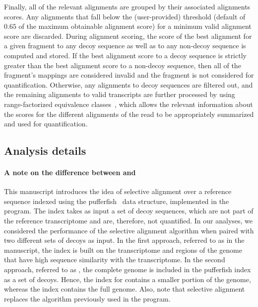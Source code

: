 Finally, all of the relevant alignments are grouped by their associated
alignments scores. Any alignments that fall below the (user-provided) threshold
(default of $0.65$ of the maximum obtainable alignment score) for a minimum
valid alignment score are discarded. During alignment scoring, the score of the
best alignment for a given fragment to any decoy sequence as well as to any
non-decoy sequence is computed and stored. If the best alignment score to a
decoy sequence is strictly greater than the best alignment score to a non-decoy
sequence, then all of the fragment's mappings are considered invalid and the
fragment is not considered for quantification. Otherwise, any alignments to
decoy sequences are filtered out, and the remaining alignments to valid
transcripts are further processed by \salmon using range-factorized equivalence
classes~\cite{ddfact}, which allows the relevant information about the scores
for the different alignments of the read to be appropriately summarized and used
for quantification.

\subsection{Analysis details}
\label{subsec:notes}

\paragraph{A note on the difference between \hsa and \saf}
This manuscript introduces the idea of selective alignment over a reference sequence 
indexed using the pufferfish~\cite{pufferfish} data structure, implemented in the \salmon program. The index
takes as input a set of decoy sequences, which are not part of the reference transcriptome 
and are, therefore, not quantified. In our analyses, we considered the performance of the selective alignment 
algorithm when paired with two different sets of decoys as input. In the first approach, referred to as \hsa in the manuscript, 
the index is built on the transcriptome and regions of the genome that
have high sequence similarity with the transcriptome. In the second approach, referred to as \saf, 
the complete genome is included in the pufferfish index as a set of decoys. Hence, the 
index for \hsa contains a smaller portion of the genome, whereas the \saf index contains
the full genome. Also, note that selective alignment replaces the \qm algorithm previously 
used in the \salmon program.

